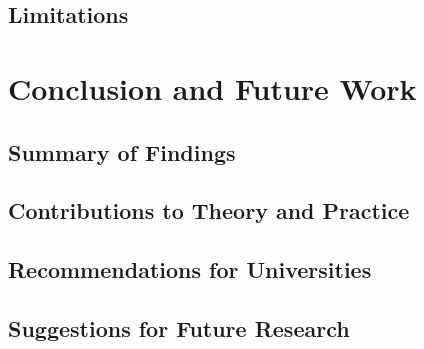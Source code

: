 \documentclass{singlecol-new}
\theoremstyle{TH}{
\newtheorem{lemma}{Lemma}
\newtheorem{theorem}[lemma]{Theorem}
\newtheorem{corrolary}[lemma]{Corrolary}
\newtheorem{conjecture}[lemma]{Conjecture}
\newtheorem{proposition}[lemma]{Proposition}
\newtheorem{claim}[lemma]{Claim}
\newtheorem{stheorem}[lemma]{Wrong Theorem}
\newtheorem{algorithm}{Algorithm}
}
\theoremstyle{THrm}{
\newtheorem{definition}{Definition}[section]
\newtheorem{question}{Question}[section]
\newtheorem{remark}{Remark}
\newtheorem{scheme}{Scheme}
}
\theoremstyle{THhit}{
\newtheorem{case}{Case}[section]
}
\begin{document}
\subsection{Limitations}

\section{Conclusion and Future Work}
\subsection{Summary of Findings}
\subsection{Contributions to Theory and Practice}
\subsection{Recommendations for Universities}
\subsection{Suggestions for Future Research}




%
%
%

\end{document}
